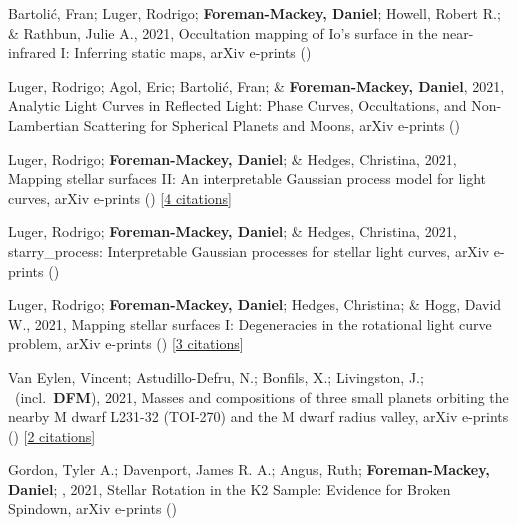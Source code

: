 \item[{\color{numcolor}\scriptsize13}] Bartoli{\'c}, Fran; Luger, Rodrigo; \textbf{Foreman-Mackey, Daniel}; Howell, Robert R.; \& Rathbun, Julie A., 2021, Occultation mapping of Io's surface in the near-infrared I: Inferring static maps, arXiv e-prints ()

\item[{\color{numcolor}\scriptsize12}] Luger, Rodrigo; Agol, Eric; Bartoli{\'c}, Fran; \& \textbf{Foreman-Mackey, Daniel}, 2021, Analytic Light Curves in Reflected Light: Phase Curves, Occultations, and Non-Lambertian Scattering for Spherical Planets and Moons, arXiv e-prints ()

\item[{\color{numcolor}\scriptsize11}] Luger, Rodrigo; \textbf{Foreman-Mackey, Daniel}; \& Hedges, Christina, 2021, Mapping stellar surfaces II: An interpretable Gaussian process model for light curves, arXiv e-prints () [\href{https://ui.adsabs.harvard.edu/abs/2021arXiv210201697L}{4 citations}]

\item[{\color{numcolor}\scriptsize10}] Luger, Rodrigo; \textbf{Foreman-Mackey, Daniel}; \& Hedges, Christina, 2021, starry{\_}process: Interpretable Gaussian processes for stellar light curves, arXiv e-prints ()

\item[{\color{numcolor}\scriptsize9}] Luger, Rodrigo; \textbf{Foreman-Mackey, Daniel}; Hedges, Christina; \& Hogg, David W., 2021, Mapping stellar surfaces I: Degeneracies in the rotational light curve problem, arXiv e-prints () [\href{https://ui.adsabs.harvard.edu/abs/2021arXiv210200007L}{3 citations}]

\item[{\color{numcolor}\scriptsize8}] Van Eylen, Vincent; Astudillo-Defru, N.; Bonfils, X.; Livingston, J.; \etal\ (incl.\ \textbf{DFM}), 2021, Masses and compositions of three small planets orbiting the nearby M dwarf L231-32 (TOI-270) and the M dwarf radius valley, arXiv e-prints () [\href{https://ui.adsabs.harvard.edu/abs/2021arXiv210101593V}{2 citations}]

\item[{\color{numcolor}\scriptsize7}] Gordon, Tyler A.; Davenport, James R. A.; Angus, Ruth; \textbf{Foreman-Mackey, Daniel}; \etal, 2021, Stellar Rotation in the K2 Sample: Evidence for Broken Spindown, arXiv e-prints ()

